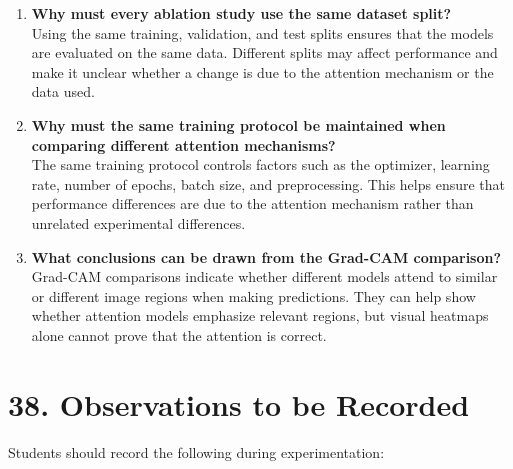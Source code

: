\documentclass[10pt]{article}
\begin{document}
\begin{enumerate}
\item \textbf{Why must every ablation study use the same dataset split?}\\
Using the same training, validation, and test splits ensures that the models are evaluated on the same data. Different splits may affect performance and make it unclear whether a change is due to the attention mechanism or the data used.

\item \textbf{Why must the same training protocol be maintained when comparing different attention mechanisms?}\\
The same training protocol controls factors such as the optimizer, learning rate, number of epochs, batch size, and preprocessing. This helps ensure that performance differences are due to the attention mechanism rather than unrelated experimental differences.

\item \textbf{What conclusions can be drawn from the Grad-CAM comparison?}\\
Grad-CAM comparisons indicate whether different models attend to similar or different image regions when making predictions. They can help show whether attention models emphasize relevant regions, but visual heatmaps alone cannot prove that the attention is correct.

\end{enumerate}

\section*{38. Observations to be Recorded}

Students should record the following during experimentation:
\end{document}
